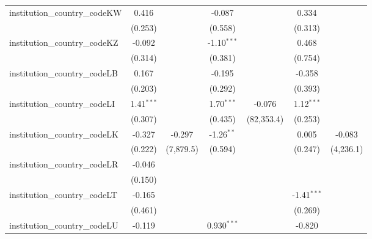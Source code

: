 \begin{tabular}{lcccccc}
   institution\_country\_codeKW          & 0.416          &               & -0.087         &               & 0.334          &   \\   
                                         & (0.253)        &               & (0.558)        &               & (0.313)        &   \\   
   institution\_country\_codeKZ          & -0.092         &               & -1.10$^{***}$  &               & 0.468          &   \\   
                                         & (0.314)        &               & (0.381)        &               & (0.754)        &   \\   
   institution\_country\_codeLB          & 0.167          &               & -0.195         &               & -0.358         &   \\   
                                         & (0.203)        &               & (0.292)        &               & (0.393)        &   \\   
   institution\_country\_codeLI          & 1.41$^{***}$   &               & 1.70$^{***}$   & -0.076        & 1.12$^{***}$   &   \\   
                                         & (0.307)        &               & (0.435)        & (82,353.4)    & (0.253)        &   \\   
   institution\_country\_codeLK          & -0.327         & -0.297        & -1.26$^{**}$   &               & 0.005          & -0.083\\   
                                         & (0.222)        & (7,879.5)     & (0.594)        &               & (0.247)        & (4,236.1)\\   
   institution\_country\_codeLR          & -0.046         &               &                &               &                &   \\   
                                         & (0.150)        &               &                &               &                &   \\   
   institution\_country\_codeLT          & -0.165         &               &                &               & -1.41$^{***}$  &   \\   
                                         & (0.461)        &               &                &               & (0.269)        &   \\   
   institution\_country\_codeLU          & -0.119         &               & 0.930$^{***}$  &               & -0.820         &   \\   

\end{tabular}
